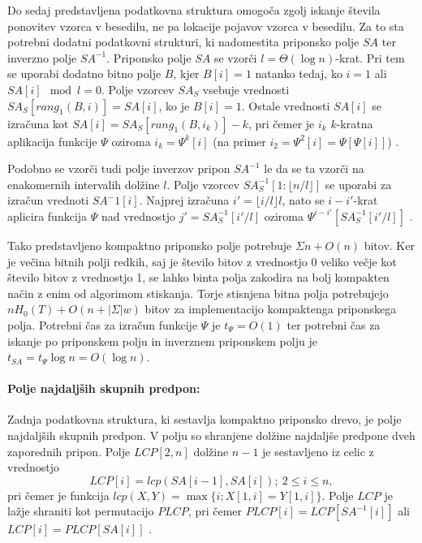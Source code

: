 Do sedaj predstavljena podatkovna struktura omogoča zgolj iskanje števila ponovitev vzorca v besedilu, ne pa lokacije pojavov vzorca v besedilu. Za to sta potrebni dodatni podatkovni strukturi, ki nadomestita priponsko polje $SA$ ter inverzno polje $SA^{-1}$. Priponsko polje $SA$ se vzorči $l=\Theta(\log{n})$-krat. Pri tem se uporabi dodatno bitno polje $B$, kjer $B[i]=1$ natanko tedaj, ko $i=1$ ali $SA[i]\mod{l} =0$. Polje vzorcev $SA_S$ vsebuje vrednosti $SA_S[rang_1(B,i)]=SA[i]$, ko je $B[i]=1$. Ostale vrednosti $SA[i]$ se izračuna kot $SA[i]=SA_S[rang_1(B,i_k)]-k$, pri čemer je $i_k$ $k$-kratna aplikacija funkcije $\Psi$ oziroma $i_k=\Psi^k[i]$ (na primer $i_2=\Psi^2[i]=\Psi[\Psi[i]]$) \cite{Navarro2016}.

Podobno se vzorči tudi polje inverzov pripon $SA^{-1}$ le da se ta vzorči na enakomernih intervalih dolžine $l$. Polje vzorcev $SA^{-1}_S[1:\lfloor n/l\rfloor]$ se uporabi za izračun vrednoti $SA^-1[i]$. Najprej izračuna $i'=\lfloor i/l\rfloor l$, nato se $i-i'$-krat aplicira funkcija $\Psi$ nad vrednostjo $j'=SA^{-1}_S[i'/l]$ oziroma $\Psi^{i-i'}[SA^{-1}_S[i'/l]]$ \cite{Navarro2016}.

Tako predstavljeno kompaktno priponsko polje potrebuje $\Sigma n + O(n)$ bitov. Ker je večina bitnih polji redkih, saj je število bitov z vrednostjo 0 veliko večje kot število bitov z vrednostjo 1, se lahko binta polja zakodira na bolj kompakten način z enim od algorimom stiskanja. Torje stisnjena bitna polja potrebujejo $nH_0(T)+O(n+|\Sigma|w)$ bitov za implementacijo kompaktenga priponskega polja. Potrebni čas za izračun funkcije $\Psi$ je $t_\Psi=O(1)$ ter potrebni čas za iskanje po priponskem polju in inverznem priponskem polju je $t_{SA}=t_\Psi \log{n} = O( \log{n})$.


\paragraph{Polje najdaljših skupnih predpon:}
Zadnja podatkovna struktura, ki sestavlja kompaktno priponsko drevo, je polje najdaljših skupnih predpon. V polju so shranjene dolžine najdaljše predpone dveh zaporednih pripon. Polje $LCP[2,n]$ dolžine $n-1$ je sestavljeno iz celic z vrednostjo
$$
    LCP[i]=lcp(SA[i-1],SA[i]);\:2\le i\le n,
$$
pri čemer je funkcija $lcp(X,Y)=\max\{i;X[1,i]=Y[1,i]\}$. Polje $LCP$ je lažje shraniti kot permutacijo $PLCP$, pri čemer $PLCP[i]=LCP[SA^{-1}[i]]$ ali $LCP[i]=PLCP[SA[i]]$  \cite{Navarro2016}.


